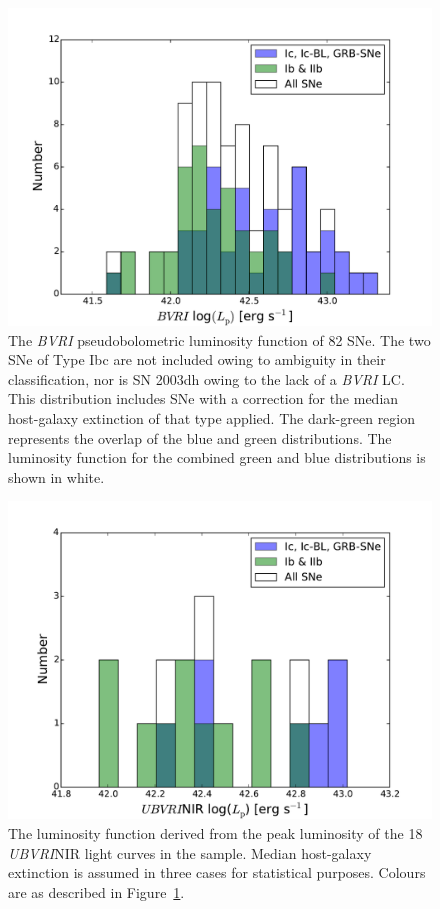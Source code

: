 \documentclass[a4paper,fleqn,usenatbib]{mnras}
\begin{document}
\begin{figure}
\centering
\includegraphics[scale=0.4]{BVRI_luminosity_function.pdf}
\caption{The \textit{BVRI} pseudobolometric luminosity function of 82 SNe. The two SNe of Type Ibc are not included owing to ambiguity in their classification, nor is SN 2003dh owing to the lack of a \textit{BVRI} LC. This distribution includes SNe with a correction for the median host-galaxy extinction of that type applied.  The dark-green region represents the overlap of the blue and green distributions. The luminosity function for the combined green and blue distributions is shown in white.}
\label{fig:BVRIlumfunc}
\end{figure}
 
\begin{figure}
\centering
\includegraphics[scale=0.4]{int_ONIR_lumfunc.pdf}
\caption{The luminosity function derived from the peak luminosity of the 18 \textit{UBVRI}NIR light curves in the sample. Median host-galaxy extinction is assumed in three cases for statistical purposes. Colours are as described in Figure~\ref{fig:BVRIlumfunc}. }
\label{fig:fulllumfunc}
\end{figure}
\end{document}
